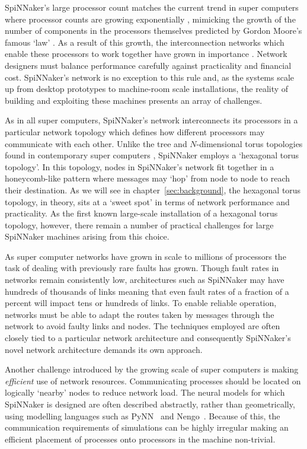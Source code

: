 SpiNNaker's large processor count matches the current trend in super computers
where processor counts are growing exponentially \cite{meuer16j}, mimicking the
growth of the number of components in the processors themselves predicted by
Gordon Moore's famous `law' \cite{moore75}. As a result of this growth, the
interconnection networks which enable these processors to work together have
grown in importance \cite{dally01}. Network designers must balance performance
carefully against practicality and financial cost.  SpiNNaker's network is no
exception to this rule and, as the systems scale up from desktop prototypes to
machine-room scale installations, the reality of building and exploiting these
machines presents an array of challenges.

As in all super computers, SpiNNaker's network interconnects its processors in
a particular network topology which defines how different processors may
communicate with each other. Unlike the tree and $N$-dimensional torus
topologies found in contemporary super computers \cite[chapter~3]{dally04},
SpiNNaker employs a `hexagonal torus topology'. In this topology, nodes in
SpiNNaker's network fit together in a honeycomb-like pattern where messages may
`hop' from node to node to reach their destination. As we will see in
chapter~\ref{sec:background}, the hexagonal torus topology, in theory, sits at
a `sweet spot' in terms of network performance and practicality. As the first
known large-scale installation of a hexagonal torus topology, however, there
remain a number of practical challenges for large SpiNNaker machines arising
from this choice.

As super computer networks have grown in scale to millions of processors the
task of dealing with previously rare faults has grown.  Though fault rates in
networks remain consistently low, architectures such as SpiNNaker may have
hundreds of thousands of links meaning that even fault rates of a fraction of a
percent will impact tens or hundreds of links. To enable reliable operation,
networks must be able to adapt the routes taken by messages through the network
to avoid faulty links and nodes. The techniques employed are often closely tied
to a particular network architecture and consequently SpiNNaker's novel network
architecture demands its own approach.

Another challenge introduced by the growing scale of super computers is making
\emph{efficient} use of network resources. Communicating processes should be
located on logically `nearby' nodes to reduce network load. The neural models
for which SpiNNaker is designed are often described abstractly, rather than
geometrically, using modelling languages such as PyNN~\cite{davison08} and
Nengo~\cite{eliasmith04}.  Because of this, the communication requirements of
simulations can be highly irregular making an efficient placement of processes
onto processors in the machine non-trivial.

